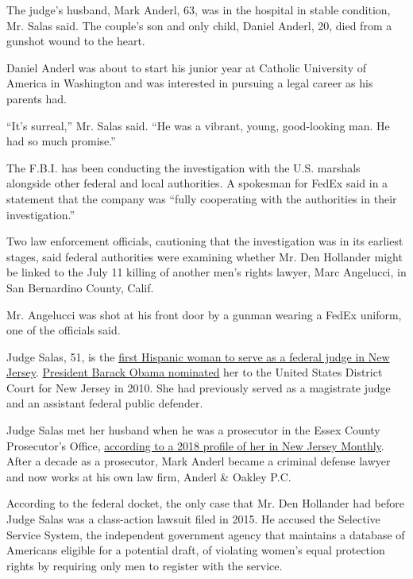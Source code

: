 The judge's husband, Mark Anderl, 63, was in the hospital in stable
condition, Mr. Salas said. The couple's son and only child, Daniel
Anderl, 20, died from a gunshot wound to the heart.

Daniel Anderl was about to start his junior year at Catholic University
of America in Washington and was interested in pursuing a legal career
as his parents had.

``It's surreal,'' Mr. Salas said. ``He was a vibrant, young,
good-looking man. He had so much promise.''

The F.B.I. has been conducting the investigation with the U.S. marshals
alongside other federal and local authorities. A spokesman for FedEx
said in a statement that the company was ``fully cooperating with the
authorities in their investigation.''

Two law enforcement officials, cautioning that the investigation was in
its earliest stages, said federal authorities were examining whether Mr.
Den Hollander might be linked to the July 11 killing of another men's
rights lawyer, Marc Angelucci, in San Bernardino County, Calif.

Mr. Angelucci was shot at his front door by a gunman wearing a FedEx
uniform, one of the officials said.

Judge Salas, 51, is the
\href{https://www.nj.com/news/2011/06/nj_appoints_first_hispanic_wom.html}{first
Hispanic woman to serve as a federal judge in New Jersey}.
\href{https://obamawhitehouse.archives.gov/the-press-office/2010/12/01/president-obama-names-seven-united-states-district-court}{President
Barack Obama nominated} her to the United States District Court for New
Jersey in 2010. She had previously served as a magistrate judge and an
assistant federal public defender.

Judge Salas met her husband when he was a prosecutor in the Essex County
Prosecutor's Office,
\href{https://njmonthly.com/articles/politics-public-affairs/immigration-stories-esther-salas/}{according
to a 2018 profile of her in New Jersey Monthly}. After a decade as a
prosecutor, Mark Anderl became a criminal defense lawyer and now works
at his own law firm, Anderl \& Oakley P.C.

According to the federal docket, the only case that Mr. Den Hollander
had before Judge Salas was a class-action lawsuit filed in 2015. He
accused the Selective Service System, the independent government agency
that maintains a database of Americans eligible for a potential draft,
of violating women's equal protection rights by requiring only men to
register with the service.

